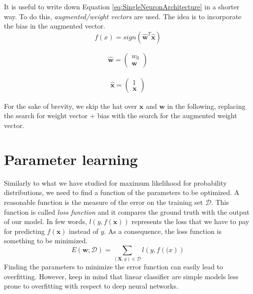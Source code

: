It is useful to write down Equation \ref{eq:SingleNeuronArchitecture} in a shorter way. To do this, \textit{augmented/weight vectors} are used. The idea is to incorporate the bias in the augmented vector.
\begin{equation}
    f(x) = \mathit{sign}(\pmb{\hat{w}}^T \pmb{\hat{x}})
\end{equation}

\begin{align}
    \pmb{\hat{w}} =
    \begin{pmatrix}
        w_0 \\
        \pmb{w}
    \end{pmatrix}
\end{align}

\begin{align}
    \pmb{\hat{x}} =
    \begin{pmatrix}
        1 \\
        \pmb{x}
    \end{pmatrix}
\end{align}

For the sake of brevity, we skip the hat over $\pmb{x}$ and $\pmb{w}$ in the following, replacing the search for weight vector + bias with the search for the augmented weight vector.

\section{Parameter learning}
Similarly to what we have studied for maximum likelihood for probability distributions, we need to find a function of the parameters to be optimized. A reasonable function is the measure of the error on the training set $\mathcal{D}$. This function is called \textit{loss function} and it compares the ground truth with the output of our model. In few words, $l(y, f(\pmb{x}))$ represents the loss that we have to pay for predicting $f(\pmb{x})$ instead of $y$. As a consequence, the loss function is something to be minimized.
\begin{equation}
    \label{eq:parameterLearning_errorMinimization}
    E(\pmb{w}; \mathcal{D}) = \sum_{(\pmb{X},y) \in \mathcal{D}} l(y, f(\pmb(x))
\end{equation}
Finding the parameters to minimize the error function can easily lead to overfitting. However, keep in mind that linear classifier are simple models less prone to overfitting with respect to deep neural networks.

